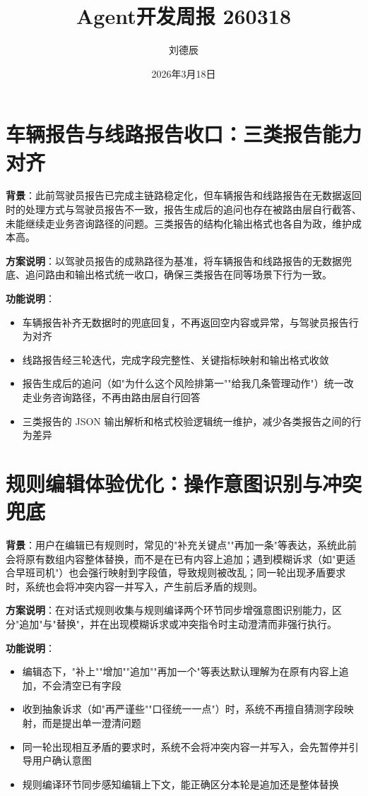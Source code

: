 \documentclass[UTF8]{ctexart}
\title{Agent开发周报 260318}
\author{刘德辰}
\date{2026年3月18日}
\begin{document}
\maketitle

\section{车辆报告与线路报告收口：三类报告能力对齐}

\textbf{背景}：此前驾驶员报告已完成主链路稳定化，但车辆报告和线路报告在无数据返回时的处理方式与驾驶员报告不一致，报告生成后的追问也存在被路由层自行截答、未能继续走业务咨询路径的问题。三类报告的结构化输出格式也各自为政，维护成本高。

\textbf{方案说明}：以驾驶员报告的成熟路径为基准，将车辆报告和线路报告的无数据兜底、追问路由和输出格式统一收口，确保三类报告在同等场景下行为一致。

\textbf{功能说明}：
\begin{itemize}
\item 车辆报告补齐无数据时的兜底回复，不再返回空内容或异常，与驾驶员报告行为对齐
\item 线路报告经三轮迭代，完成字段完整性、关键指标映射和输出格式收敛
\item 报告生成后的追问（如"为什么这个风险排第一""给我几条管理动作"）统一改走业务咨询路径，不再由路由层自行回答
\item 三类报告的 JSON 输出解析和格式校验逻辑统一维护，减少各类报告之间的行为差异
\end{itemize}

\section{规则编辑体验优化：操作意图识别与冲突兜底}

\textbf{背景}：用户在编辑已有规则时，常见的"补充关键点""再加一条"等表达，系统此前会将原有数组内容整体替换，而不是在已有内容上追加；遇到模糊诉求（如"更适合早班司机"）也会强行映射到字段值，导致规则被改乱；同一轮出现矛盾要求时，系统也会将冲突内容一并写入，产生前后矛盾的规则。

\textbf{方案说明}：在对话式规则收集与规则编译两个环节同步增强意图识别能力，区分"追加"与"替换"，并在出现模糊诉求或冲突指令时主动澄清而非强行执行。

\textbf{功能说明}：
\begin{itemize}
\item 编辑态下，"补上""增加""追加""再加一个"等表达默认理解为在原有内容上追加，不会清空已有字段
\item 收到抽象诉求（如"再严谨些""口径统一一点"）时，系统不再擅自猜测字段映射，而是提出单一澄清问题
\item 同一轮出现相互矛盾的要求时，系统不会将冲突内容一并写入，会先暂停并引导用户确认意图
\item 规则编译环节同步感知编辑上下文，能正确区分本轮是追加还是整体替换
\end{itemize}
\end{document}
